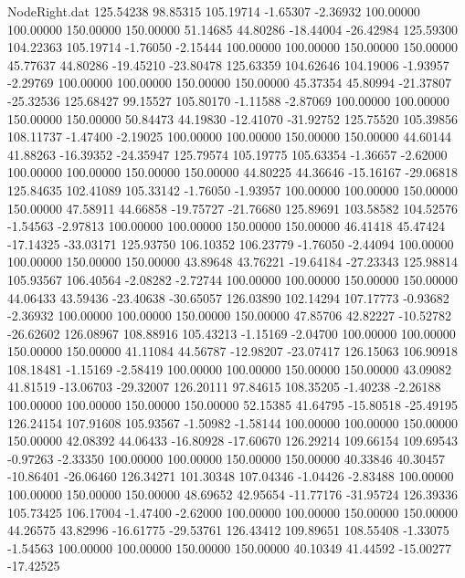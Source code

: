 \begin{filecontents}{NodeRight.dat}
 125.54238   98.85315  105.19714    -1.65307   -2.36932  100.00000  100.00000  150.00000  150.00000   51.14685   44.80286  -18.44004  -26.42984
 125.59300  104.22363  105.19714    -1.76050   -2.15444  100.00000  100.00000  150.00000  150.00000   45.77637   44.80286  -19.45210  -23.80478
 125.63359  104.62646  104.19006    -1.93957   -2.29769  100.00000  100.00000  150.00000  150.00000   45.37354   45.80994  -21.37807  -25.32536
 125.68427   99.15527  105.80170    -1.11588   -2.87069  100.00000  100.00000  150.00000  150.00000   50.84473   44.19830  -12.41070  -31.92752
 125.75520  105.39856  108.11737    -1.47400   -2.19025  100.00000  100.00000  150.00000  150.00000   44.60144   41.88263  -16.39352  -24.35947
 125.79574  105.19775  105.63354    -1.36657   -2.62000  100.00000  100.00000  150.00000  150.00000   44.80225   44.36646  -15.16167  -29.06818
 125.84635  102.41089  105.33142    -1.76050   -1.93957  100.00000  100.00000  150.00000  150.00000   47.58911   44.66858  -19.75727  -21.76680
 125.89691  103.58582  104.52576    -1.54563   -2.97813  100.00000  100.00000  150.00000  150.00000   46.41418   45.47424  -17.14325  -33.03171
 125.93750  106.10352  106.23779    -1.76050   -2.44094  100.00000  100.00000  150.00000  150.00000   43.89648   43.76221  -19.64184  -27.23343
 125.98814  105.93567  106.40564    -2.08282   -2.72744  100.00000  100.00000  150.00000  150.00000   44.06433   43.59436  -23.40638  -30.65057
 126.03890  102.14294  107.17773    -0.93682   -2.36932  100.00000  100.00000  150.00000  150.00000   47.85706   42.82227  -10.52782  -26.62602
 126.08967  108.88916  105.43213    -1.15169   -2.04700  100.00000  100.00000  150.00000  150.00000   41.11084   44.56787  -12.98207  -23.07417
 126.15063  106.90918  108.18481    -1.15169   -2.58419  100.00000  100.00000  150.00000  150.00000   43.09082   41.81519  -13.06703  -29.32007
 126.20111   97.84615  108.35205    -1.40238   -2.26188  100.00000  100.00000  150.00000  150.00000   52.15385   41.64795  -15.80518  -25.49195
 126.24154  107.91608  105.93567    -1.50982   -1.58144  100.00000  100.00000  150.00000  150.00000   42.08392   44.06433  -16.80928  -17.60670
 126.29214  109.66154  109.69543    -0.97263   -2.33350  100.00000  100.00000  150.00000  150.00000   40.33846   40.30457  -10.86401  -26.06460
 126.34271  101.30348  107.04346    -1.04426   -2.83488  100.00000  100.00000  150.00000  150.00000   48.69652   42.95654  -11.77176  -31.95724
 126.39336  105.73425  106.17004    -1.47400   -2.62000  100.00000  100.00000  150.00000  150.00000   44.26575   43.82996  -16.61775  -29.53761
 126.43412  109.89651  108.55408    -1.33075   -1.54563  100.00000  100.00000  150.00000  150.00000   40.10349   41.44592  -15.00277  -17.42525

\end{filecontents}
